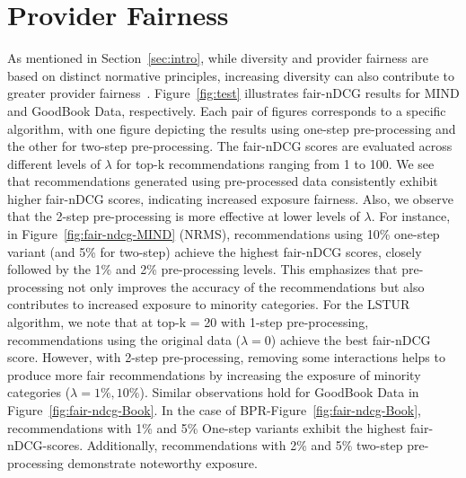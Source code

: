 \documentclass[runningheads]{llncs}
\begin{document}
\section{Provider Fairness}
As mentioned in Section~\ref{sec:intro}, while diversity and provider fairness are based on distinct normative principles, increasing diversity can also contribute to greater provider fairness~\cite{Ekstrand2022}. 
Figure~\ref{fig:test} illustrates %
fair-nDCG results for MIND and GoodBook Data, respectively.  
Each pair of figures corresponds to a specific algorithm, with one figure depicting the results using one-step pre-processing and the other for two-step pre-processing. 
The fair-nDCG scores are evaluated across different levels of $\lambda$ for top-k recommendations ranging from 1 to 100. 
We see that recommendations generated using pre-processed data consistently exhibit higher fair-nDCG scores, indicating increased exposure fairness. 
Also, we observe that the 2-step pre-processing is more effective at lower levels of $\lambda$.  
For instance, in Figure~\ref{fig:fair-ndcg-MIND} (NRMS), recommendations using 10\% one-step variant (and 5\% for two-step) achieve the highest fair-nDCG scores, closely followed by the 1\% and 2\% pre-processing levels.
This emphasizes that pre-processing not only improves the accuracy of the recommendations but also contributes to increased exposure to minority categories. 
For the LSTUR algorithm, we note that at top-k = 20 with 1-step pre-processing, recommendations using the original data ($\lambda = 0$) achieve the best fair-nDCG score. However, with 2-step pre-processing, removing some interactions helps to produce more fair recommendations by increasing the exposure of minority categories ($\lambda = 1\%, 10\%$).
Similar observations hold for GoodBook Data in Figure~\ref{fig:fair-ndcg-Book}. 
In the case of BPR-Figure~\ref{fig:fair-ndcg-Book}, recommendations with 1\% and 5\% One-step variants exhibit the highest fair-nDCG-scores. 
Additionally, recommendations with 2\% and 5\% two-step pre-processing demonstrate noteworthy exposure.
\end{document}
